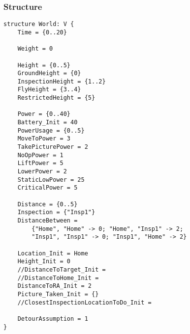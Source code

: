 \documentclass[12pt]{extarticle}
\begin{document}
\subsubsection*{Structure}
\begin{lstlisting}[basicstyle=\tiny]
structure World: V {
    Time = {0..20}
    
    Weight = 0
    
    Height = {0..5}
    GroundHeight = {0}
    InspectionHeight = {1..2}
    FlyHeight = {3..4}
    RestrictedHeight = {5}
    
    Power = {0..40}
    Battery_Init = 40
    PowerUsage = {0..5}
    MoveToPower = 3
    TakePicturePower = 2
    NoOpPower = 1
    LiftPower = 5
    LowerPower = 2
    StaticLowPower = 25
    CriticalPower = 5
    
    Distance = {0..5}
    Inspection = {"Insp1"}
    DistanceBetween =
    	{"Home", "Home" -> 0; "Home", "Insp1" -> 2;
        "Insp1", "Insp1" -> 0; "Insp1", "Home" -> 2}
    
    Location_Init = Home
    Height_Init = 0
    //DistanceToTarget_Init =
    //DistanceToHome_Init =
    DistanceToRA_Init = 2
    Picture_Taken_Init = {}
    //ClosestInspectionLocationToDo_Init =
    
    DetourAssumption = 1
}
\end{lstlisting}
\end{document}
